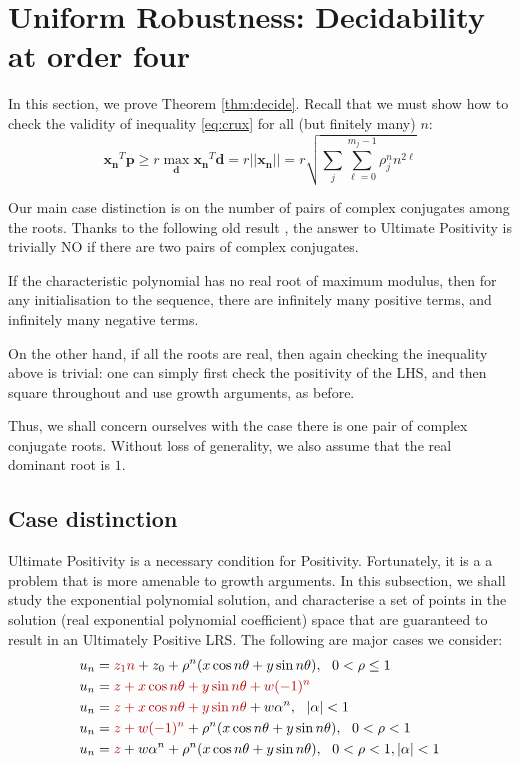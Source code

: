\section{Uniform Robustness: Decidability at order four}
\label{section:decidability}
In this section, we prove Theorem \ref{thm:decide}. Recall that we must show how to check the validity of inequality \ref{eq:crux} for all (but finitely many) $n$:
$$
\mathbf{x_n}^T\mathbf{p} \ge r\max_{\mathbf{d}}\mathbf{x_n}^T\mathbf{d} = r ||\mathbf{x_n}|| = r \sqrt{\sum_{j} \sum_{\ell=0}^{m_j-1} \rho_j^n n^{2\ell}}
$$

Our main case distinction is on the number of pairs of complex conjugates among the roots. Thanks to the following old result \cite[Thm. 2]{positive-dominant}, the answer to Ultimate Positivity is trivially NO if there are two pairs of complex conjugates.

\begin{proposition}[Folklore]
\label{prop:folklore}
If the characteristic polynomial has no real root of maximum modulus, then for any initialisation to the sequence, there are infinitely many positive terms, and infinitely many negative terms.
\end{proposition}

On the other hand, if all the roots are real, then again checking the inequality above is trivial: one can simply first check the positivity of the LHS, and then square throughout and use growth arguments, as before. 

Thus, we shall concern ourselves with the case there is one pair of complex conjugate roots. Without loss of generality, we also assume that the real dominant root is $1$.

\subsection{Case distinction}
Ultimate Positivity is a necessary condition for Positivity. Fortunately, it is a a problem that is more amenable to growth arguments. In this subsection, we shall study the exponential polynomial solution, and characterise a set of points in the solution (real exponential polynomial coefficient) space that are guaranteed to result in an Ultimately Positive LRS. The following are major cases we consider:
\begin{align}
\label{eq:unityrep}
u_n &= {\color{red!70!black} z_1 n} + z_0 + \rho^n (x \cos n\theta + y \sin n \theta), ~~ 0< \rho \le 1 \\
\label{eq:fourdom}
u_n &= {\color{red!70!black} z + x\cos n\theta + y\sin n\theta + w(-1)^n} \\
\label{eq:threedom}
u_n &= {\color{red!70!black} z + x\cos n\theta + y\sin n\theta} + w\alpha^n, ~~|\alpha| < 1 \\
\label{eq:twodom}
u_n &= {\color{red!70!black}z + w(-1)^n} + \rho^n(x\cos n\theta + y\sin n\theta), ~~ 0< \rho < 1 \\
\label{eq:onedom}
u_n &= {\color{red!70!black}z} + w\alpha^n + \rho^n(x\cos n\theta + y\sin n\theta), ~~ 0< \rho < 1, |\alpha| < 1
\end{align}

